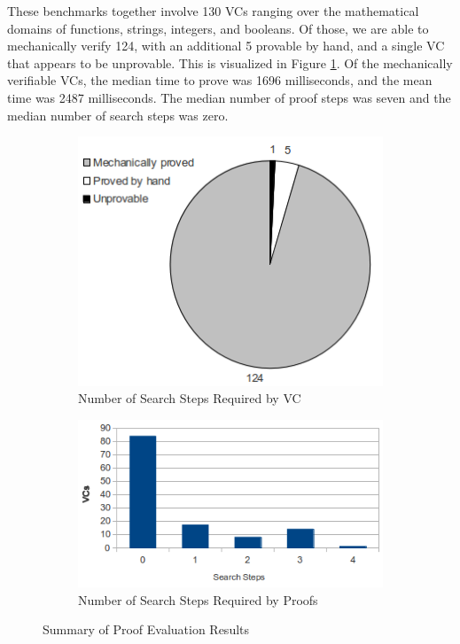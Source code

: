 These benchmarks together involve 130 VCs ranging over the mathematical domains of functions, strings, integers, and booleans.  Of those, we are able to mechanically verify 124, with an additional 5 provable by hand, and a single VC that appears to be unprovable.  This is visualized in Figure \ref{fig:pie}.  Of the mechanically verifiable VCs, the median time to prove was 1696 milliseconds, and the mean time was 2487 milliseconds.  The median number of proof steps was seven and the median number of search steps was zero.

\begin{figure}
	\centering
	\begin{subfigure}[b]{0.44\textwidth}
		\centering
		\includegraphics[width=\textwidth]{proverEval/proofResults.png}
		\caption{Number of Search Steps Required by VC\label{fig:pie}}
	\end{subfigure}
	\begin{subfigure}[b]{0.55\textwidth}
		\centering
		\includegraphics[width=\textwidth]{proverEval/searchSteps.png}
		\caption{Number of Search Steps Required by Proofs\label{fig:histogram}}
	\end{subfigure}
	\caption{Summary of Proof Evaluation Results}
\end{figure}

